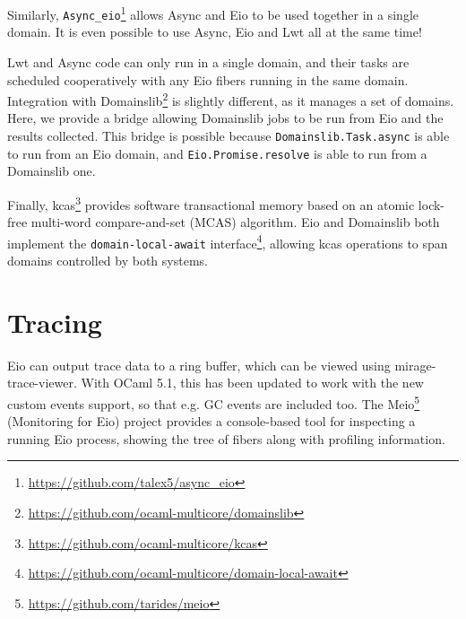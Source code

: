 \documentclass[a4paper,twocolumn]{article}
\begin{document}
Similarly, \verb|Async_eio|\footnote{\url{https://github.com/talex5/async_eio}} allows Async and Eio to be used together in a single domain.
It is even possible to use Async, Eio and Lwt all at the same time!

Lwt and Async code can only run in a single domain,
and their tasks are scheduled cooperatively with any Eio fibers running in the same domain.
Integration with Domainslib\footnote{\url{https://github.com/ocaml-multicore/domainslib}} is slightly different,
as it manages a set of domains.
Here, we provide a bridge allowing Domainslib jobs to be run from Eio and the results collected.
This bridge is possible because \verb|Domainslib.Task.async| is able to run from an Eio domain,
and \verb|Eio.Promise.resolve| is able to run from a Domainslib one.

Finally, kcas\footnote{\url{https://github.com/ocaml-multicore/kcas}} provides software transactional memory based on an atomic lock-free multi-word compare-and-set (MCAS) algorithm.
Eio and Domainslib both implement the \verb|domain-local-await| interface\footnote{\url{https://github.com/ocaml-multicore/domain-local-await}},
allowing kcas operations to span domains controlled by both systems.

\section*{Tracing}

Eio can output trace data to a ring buffer, which can be viewed using mirage-trace-viewer.
With OCaml 5.1, this has been updated to work with the new custom events support, so that e.g. GC events are included too.
The Meio\footnote{\url{https://github.com/tarides/meio}} (Monitoring for Eio) project provides a console-based tool for inspecting a running Eio process,
showing the tree of fibers along with profiling information.
\end{document}
